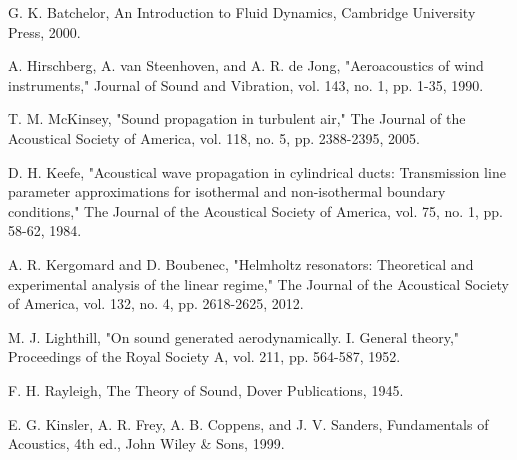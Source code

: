 \documentclass[article,12pt]{elsarticle}
\begin{document}
G. K. Batchelor, An Introduction to Fluid Dynamics, Cambridge University Press, 2000.

A. Hirschberg, A. van Steenhoven, and A. R. de Jong, "Aeroacoustics of wind instruments," Journal of Sound and Vibration, vol. 143, no. 1, pp. 1-35, 1990.

T. M. McKinsey, "Sound propagation in turbulent air," The Journal of the Acoustical Society of America, vol. 118, no. 5, pp. 2388-2395, 2005.

D. H. Keefe, "Acoustical wave propagation in cylindrical ducts: Transmission line parameter approximations for isothermal and non-isothermal boundary conditions," The Journal of the Acoustical Society of America, vol. 75, no. 1, pp. 58-62, 1984.

A. R. Kergomard and D. Boubenec, "Helmholtz resonators: Theoretical and experimental analysis of the linear regime," The Journal of the Acoustical Society of America, vol. 132, no. 4, pp. 2618-2625, 2012.

M. J. Lighthill, "On sound generated aerodynamically. I. General theory," Proceedings of the Royal Society A, vol. 211, pp. 564-587, 1952.

F. H. Rayleigh, The Theory of Sound, Dover Publications, 1945.

E. G. Kinsler, A. R. Frey, A. B. Coppens, and J. V. Sanders, Fundamentals of Acoustics, 4th ed., John Wiley & Sons, 1999.
\end{document}

